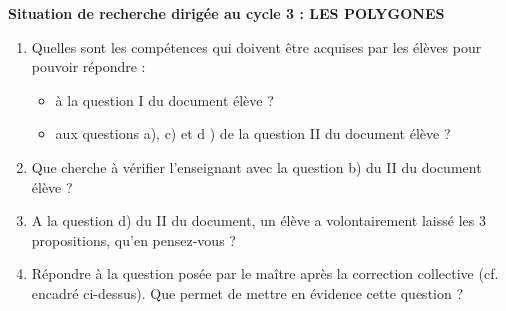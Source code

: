 \begin{exercice}
\smallskip

{\bf Situation de recherche dirigée au cycle 3 : LES POLYGONES}

\begin{center}
\end{center}

\begin{enumerate}
   \item Quelles sont les compétences qui doivent être acquises par les élèves pour pouvoir répondre :
   \begin{itemize}
      \item à la question I du document élève ?
      \item aux questions a), c) et d ) de la question II du document élève ?
   \end{itemize}
   \item Que cherche à vérifier l'enseignant avec la question b) du II du document élève ?
   \item A la question d) du II du document, un élève a volontairement laissé les 3 propositions, qu'en pensez-vous ?
   \item Répondre à la question posée par le maître après la correction collective (cf. encadré ci-dessus). Que permet de mettre en évidence cette question ?
\end{enumerate}


\end{exercice}

